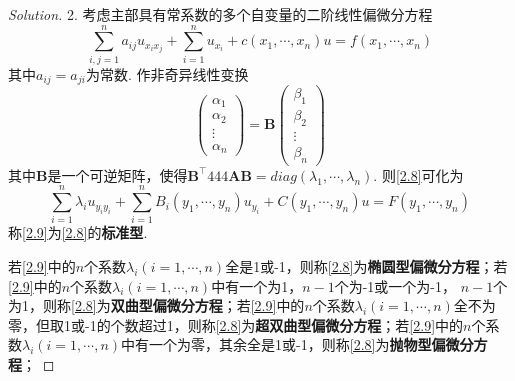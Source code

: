 \documentclass[cn,hazy,blue,14pt,screen]{elegantnote}
\begin{document}
\begin{example}
\begin{proof}[Solution]
			2. 考虑主部具有常系数的多个自变量的二阶线性偏微分方程
			\[
			\sum_{i,j=1}^{n}a_{ij}u_{x_i x_j}+\sum_{i=1}^{n}u_{x_i}+c(x_1,\cdots,x_n)u=f(x_1,\cdots,x_n)
			\label{2.8} \tag{2.8}
			\]
			其中$a_{ij}=a_{ji}$为常数.
			作非奇异线性变换
			\[\left(
			\begin{array}{c}
				\alpha_1 \\ 
				\alpha_2 \\ 
				\vdots \\ 
				\alpha_n
			\end{array}\right) 
			= \textbf{B} \left(
			\begin{array}{c}
			\beta_1 \\ 
			\beta_2 \\ 
			\vdots \\ 
			\beta_n
			\end{array}\right)
			\]
			其中\textbf{B}是一个可逆矩阵，使得$\textbf{B}^\top 444\textbf{AB}=diag(\lambda_1,\cdots,\lambda_n)$.
			则\eqref{2.8}可化为
			\[
			\sum_{i=1}^{n}\lambda_{i}u_{y_i y_i}+\sum_{i=1}^{n}B_i(y_1,\cdots,y_n)u_{y_i}+C(y_1,\cdots,y_n)u=F(y_1,\cdots,y_n)
			\label{2.9} \tag{2.9}
			\]
			称\eqref{2.9}为\eqref{2.8}的\textbf{标准型}.
			
			若\eqref{2.9}中的$n$个系数$\lambda_i(i=1,\cdots,n)$全是1或-1，则称\eqref{2.8}为\textbf{椭圆型偏微分方程}；若\eqref{2.9}中的$n$个系数$\lambda_i(i=1,\cdots,n)$中有一个为1，$n-1$个为-1或一个为-1， $n-1$个为1，则称\eqref{2.8}为\textbf{双曲型偏微分方程}；若\eqref{2.9}中的$n$个系数$\lambda_i(i=1,\cdots,n)$全不为零，但取1或-1的个数超过1，则称\eqref{2.8}为\textbf{超双曲型偏微分方程}；若\eqref{2.9}中的$n$个系数$\lambda_i(i=1,\cdots,n)$中有一个为零，其余全是1或-1，则称\eqref{2.8}为\textbf{抛物型偏微分方程}；

		\end{proof}
	\end{example}
\end{document}
